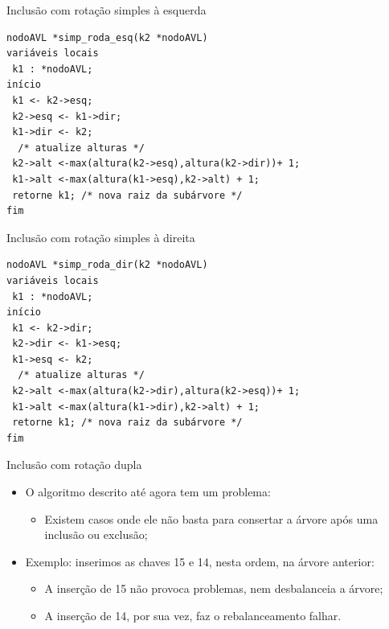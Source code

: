 \documentclass[12pt,table,xcolor={dvipsnames}]{beamer}
\begin{document}
\begin{frame}[fragile]{Inclusão com rotação simples à esquerda}
\begin{lstlisting}
nodoAVL *simp_roda_esq(k2 *nodoAVL)
variáveis locais
 k1 : *nodoAVL;
início
 k1 <- k2->esq;
 k2->esq <- k1->dir;
 k1->dir <- k2;
  /* atualize alturas */
 k2->alt <-max(altura(k2->esq),altura(k2->dir))+ 1;
 k1->alt <-max(altura(k1->esq),k2->alt) + 1;     
 retorne k1; /* nova raiz da subárvore */
fim
\end{lstlisting}
\end{frame}

\begin{frame}[fragile]{Inclusão com rotação simples à direita}
\begin{lstlisting}
nodoAVL *simp_roda_dir(k2 *nodoAVL)
variáveis locais
 k1 : *nodoAVL;
início
 k1 <- k2->dir;
 k2->dir <- k1->esq;
 k1->esq <- k2;
  /* atualize alturas */
 k2->alt <-max(altura(k2->dir),altura(k2->esq))+ 1;
 k1->alt <-max(altura(k1->dir),k2->alt) + 1;     
 retorne k1; /* nova raiz da subárvore */
fim
\end{lstlisting}
\end{frame}

\begin{frame}[fragile]{Inclusão com rotação dupla}
\begin{itemize}
\item O algoritmo descrito até agora tem um problema:
\begin{itemize}
\item Existem casos onde ele não basta para consertar a árvore após uma inclusão ou exclusão;
\end{itemize}
\item Exemplo: inserimos as chaves 15 e 14, nesta ordem, na árvore anterior:
\begin{itemize}
\item A inserção de 15 não provoca problemas, nem desbalanceia a árvore;
\item A inserção de 14, por sua vez, faz o rebalanceamento falhar.
\end{itemize}
\end{itemize}
\end{frame}
\end{document}
